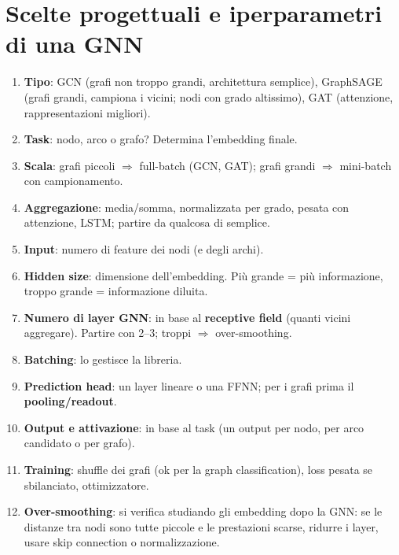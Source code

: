\section{Scelte progettuali e iperparametri di una GNN}
\begin{enumerate}
  \item \textbf{Tipo}: GCN (grafi non troppo grandi, architettura semplice), GraphSAGE (grafi grandi, campiona i vicini; nodi con grado
        altissimo), GAT (attenzione, rappresentazioni migliori).
  \item \textbf{Task}: nodo, arco o grafo? Determina l'embedding finale.
  \item \textbf{Scala}: grafi piccoli $\Rightarrow$ full-batch (GCN, GAT); grafi grandi $\Rightarrow$ mini-batch con campionamento.
  \item \textbf{Aggregazione}: media/somma, normalizzata per grado, pesata con attenzione, LSTM; partire da qualcosa di semplice.
  \item \textbf{Input}: numero di feature dei nodi (e degli archi).
  \item \textbf{Hidden size}: dimensione dell'embedding. Più grande = più informazione, troppo grande = informazione diluita.
  \item \textbf{Numero di layer GNN}: in base al \textbf{receptive field} (quanti vicini aggregare). Partire con 2--3; troppi
        $\Rightarrow$ over-smoothing.
  \item \textbf{Batching}: lo gestisce la libreria.
  \item \textbf{Prediction head}: un layer lineare o una FFNN; per i grafi prima il \textbf{pooling/readout}.
  \item \textbf{Output e attivazione}: in base al task (un output per nodo, per arco candidato o per grafo).
  \item \textbf{Training}: shuffle dei grafi (ok per la graph classification), loss pesata se sbilanciato, ottimizzatore.
  \item \textbf{Over-smoothing}: si verifica studiando gli embedding dopo la GNN: se le distanze tra nodi sono tutte piccole e le prestazioni
        scarse, ridurre i layer, usare skip connection o normalizzazione.
\end{enumerate}

